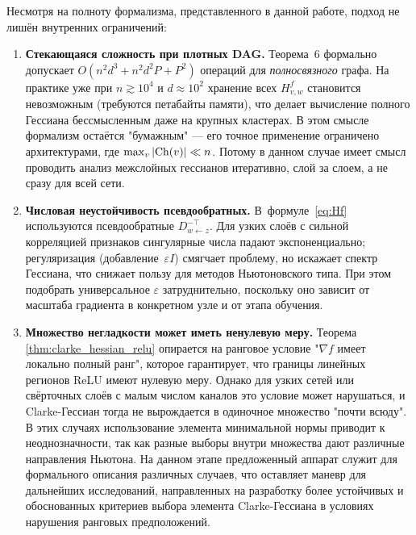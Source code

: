 \documentclass[11pt]{article}
\begin{document}
Несмотря на полноту формализма, представленного в данной работе, подход не лишён внутренних
ограничений:

\begin{enumerate}[leftmargin=1.3cm,label=\textbf{L\,\arabic*}]
  \item\label{lim:dense_graph}
    \textbf{Стекающаяся сложность при плотных DAG.}
    Теорема~6 формально допускает $O(n^2d^3 + n^2d^2P + P^2)$ операций для
    \emph{полносвязного} графа.  На практике уже при $n\gtrsim10^4$ и $d\approx10^2$
    хранение всех $H^f_{v,w}$ становится невозможным
    (требуются петабайты памяти), что делает вычисление
    полного Гессиана бессмысленным даже на крупных кластерах.
    В этом смысле формализм остаётся "бумажным" — его точное
    применение ограничено архитектурами, где
    \(\max_{v}|{\rm Ch}(v)|\ll n\). Потому в данном случае
    имеет смысл проводить анализ межслойных гессианов итеративно,
    слой за слоем, а не сразу для всей сети.

  \item\label{lim:pseudo}
    \textbf{Числовая неустойчивость псевдообратных.}
    В~формуле~\eqref{eq:Hf} используются псевдообратные
    $D_{w\gets z}^{-\top}$.  Для узких слоёв с сильной корреляцией
    признаков сингулярные числа падают экспоненциально; регуляризация
    (добавление $\,\varepsilon I$) смягчает проблему, но
    искажает спектр Гессиана, что снижает пользу для
    методов Ньютоновского типа.  При этом подобрать универсальное
    $\varepsilon$ затруднительно, поскольку оно
    зависит от масштаба градиента в конкретном узле и от этапа обучения.

  \item\label{lim:nonsmooth-measure}
    \textbf{Множество негладкости может иметь ненулевую меру.}
    Теорема \ref{thm:clarke_hessian_relu} опирается на ранговое условие "$\nabla f$ имеет локально полный
    ранг", которое гарантирует, что
    границы линейных регионов ReLU имеют нулевую меру. Однако для узких сетей или свёрточных слоёв с малым
    числом каналов это условие может нарушаться, и Clarke-Гессиан тогда не вырождается в одиночное множество
    "почти всюду". В этих случаях использование элемента минимальной нормы приводит к неоднозначности, так
    как разные выборы внутри множества дают различные направления Ньютона. На данном этапе предложенный
    аппарат служит для формального описания различных случаев, что оставляет маневр для дальнейших
    исследований, направленных на разработку более устойчивых и обоснованных критериев выбора элемента
    Clarke-Гессиана в условиях нарушения ранговых предположений.


\end{enumerate}
\end{document}
